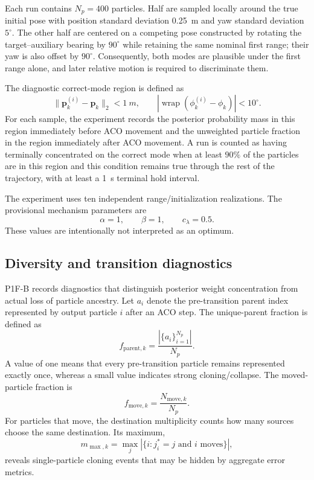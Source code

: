 Each run contains $N_p=400$ particles. Half are sampled locally around the true initial pose with position standard deviation \SI{0.25}{m} and yaw standard deviation $5^\circ$. The other half are centered on a competing pose constructed by rotating the target--auxiliary bearing by $90^\circ$ while retaining the same nominal first range; their yaw is also offset by $90^\circ$. Consequently, both modes are plausible under the first range alone, and later relative motion is required to discriminate them.

The diagnostic correct-mode region is defined as
\begin{equation}
    \lVert\bm p_k^{(i)}-\bm p_k\rVert_2<\SI{1}{m},
    \qquad
    |\operatorname{wrap}(\phi_k^{(i)}-\phi_k)|<10^\circ.
\end{equation}
For each sample, the experiment records the posterior probability mass in this region immediately before ACO movement and the unweighted particle fraction in the region immediately after ACO movement. A run is counted as having terminally concentrated on the correct mode when at least $90\%$ of the particles are in this region and this condition remains true through the rest of the trajectory, with at least a \SI{1}{s} terminal hold interval.

The experiment uses ten independent range/initialization realizations. The provisional mechanism parameters are
\begin{equation}
    \alpha=1,\qquad \beta=1,\qquad c_\lambda=0.5.
\end{equation}
These values are intentionally not interpreted as an optimum.

\subsection{Diversity and transition diagnostics}
P1F-B records diagnostics that distinguish posterior weight concentration from actual loss of particle ancestry. Let $a_i$ denote the pre-transition parent index represented by output particle $i$ after an ACO step. The unique-parent fraction is defined as
\begin{equation}
    f_{\mathrm{parent},k}
    =\frac{|\{a_i\}_{i=1}^{N_p}|}{N_p}.
\end{equation}
A value of one means that every pre-transition particle remains represented exactly once, whereas a small value indicates strong cloning/collapse. The moved-particle fraction is
\begin{equation}
    f_{\mathrm{move},k}=\frac{N_{\mathrm{move},k}}{N_p}.
\end{equation}
For particles that move, the destination multiplicity counts how many sources choose the same destination. Its maximum,
\begin{equation}
    m_{\max,k}=\max_j |\{i:j_i^*=j\text{ and }i\text{ moves}\}|,
\end{equation}
reveals single-particle cloning events that may be hidden by aggregate error metrics.

